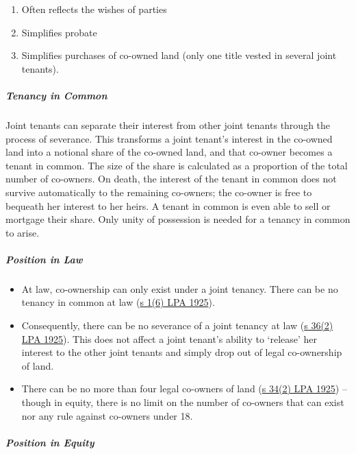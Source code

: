\documentclass[
]{article}
\providecommand{\tightlist}{%
  \setlength{\itemsep}{0pt}\setlength{\parskip}{0pt}}
\begin{document}
\begin{enumerate}
\def\labelenumi{\arabic{enumi}.}
\tightlist
\item
  Often reflects the wishes of parties
\item
  Simplifies probate
\item
  Simplifies purchases of co-owned land (only one title vested in
  several joint tenants).
\end{enumerate}

\hypertarget{tenancy-in-common-1}{%
\subparagraph{Tenancy in Common}\label{tenancy-in-common-1}}

Joint tenants can separate their interest from other joint tenants
through the process of severance. This transforms a joint tenant's
interest in the co-owned land into a notional share of the co-owned
land, and that co-owner becomes a tenant in common. The size of the
share is calculated as a proportion of the total number of co-owners. On
death, the interest of the tenant in common does not survive
automatically to the remaining co-owners; the co-owner is free to
bequeath her interest to her heirs. A tenant in common is even able to
sell or mortgage their share. Only unity of possession is needed for a
tenancy in common to arise.

\hypertarget{position-in-law}{%
\subparagraph{Position in Law}\label{position-in-law}}

\begin{itemize}
\tightlist
\item
  At law, co-ownership can only exist under a joint tenancy. There can
  be no tenancy in common at law
  (\href{https://www.legislation.gov.uk/ukpga/Geo5/15-16/20/section/1}{s
  1(6) LPA 1925}).
\item
  Consequently, there can be no severance of a joint tenancy at law
  (\href{https://www.legislation.gov.uk/ukpga/Geo5/15-16/20/section/36}{s
  36(2) LPA 1925}). This does not affect a joint tenant's ability to
  `release' her interest to the other joint tenants and simply drop out
  of legal co-ownership of land.
\item
  There can be no more than four legal co-owners of land
  (\href{https://www.legislation.gov.uk/ukpga/Geo5/15-16/20/section/34}{s
  34(2) LPA 1925}) -- though in equity, there is no limit on the number
  of co-owners that can exist nor any rule against co-owners under 18.
\end{itemize}

\hypertarget{position-in-equity}{%
\subparagraph{Position in Equity}\label{position-in-equity}}
\end{document}
